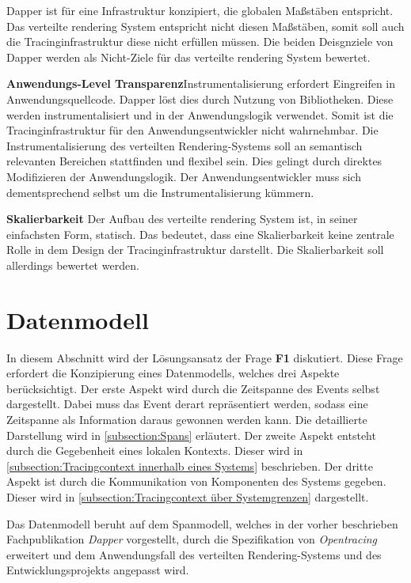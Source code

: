 Dapper ist für eine Infrastruktur konzipiert, die globalen  Maßstäben entspricht. Das verteilte rendering System entspricht nicht diesen Maßstäben, somit soll auch die Tracinginfrastruktur diese nicht erfüllen müssen. Die beiden Deisgnziele von Dapper werden als Nicht-Ziele für das verteilte rendering System bewertet.

\textbf{Anwendungs-Level Transparenz}\space\space\space Instrumentalisierung erfordert Eingreifen in Anwendungsquellcode. Dapper löst dies durch Nutzung von Bibliotheken. Diese werden instrumentalisiert und in der Anwendungslogik verwendet. Somit ist die Tracinginfrastruktur für den Anwendungsentwickler nicht wahrnehmbar. Die Instrumentalisierung des verteilten Rendering-Systems soll an semantisch relevanten Bereichen stattfinden und flexibel sein. Dies gelingt durch direktes Modifizieren der Anwendungslogik. Der Anwendungsentwickler muss sich dementsprechend selbst um die Instrumentalisierung kümmern. 

\textbf{Skalierbarkeit} \space\space\space Der Aufbau des verteilte rendering System ist, in seiner einfachsten Form, statisch. Das bedeutet, dass eine Skalierbarkeit keine zentrale Rolle in dem Design der Tracinginfrastruktur darstellt. Die Skalierbarkeit soll allerdings bewertet werden. 

\section{Datenmodell}
\label{section:Datenmodell}

In diesem Abschnitt wird der Lösungsansatz der Frage \textbf{F1} diskutiert.
Diese Frage erfordert die Konzipierung eines Datenmodells, welches drei Aspekte berücksichtigt. Der erste Aspekt wird durch die Zeitspanne des Events selbst dargestellt. Dabei muss das Event derart repräsentiert werden, sodass eine Zeitspanne als Information daraus gewonnen werden kann. Die detaillierte Darstellung wird in \cref{subsection:Spans} erläutert. Der zweite Aspekt entsteht durch die Gegebenheit eines lokalen Kontexts. Dieser wird in \cref{subsection:Tracingcontext innerhalb eines Systems} beschrieben. Der dritte Aspekt ist durch die Kommunikation von Komponenten des Systems gegeben. Dieser wird  in \cref{subsection:Tracingcontext über Systemgrenzen} dargestellt.


Das Datenmodell beruht auf dem Spanmodell, welches in der vorher beschrieben Fachpublikation \emph{Dapper} vorgestellt, durch die Spezifikation von \emph{Opentracing} erweitert und dem Anwendungsfall des verteilten Rendering-Systems und des Entwicklungsprojekts angepasst wird.

